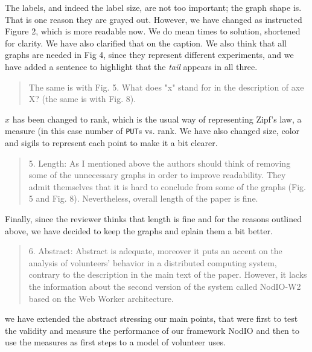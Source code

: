 \documentclass[preprint]{elsarticle}
\begin{document}
The labels, and indeed the label size, are not too important; the
graph shape is. That is one reason they are grayed out. However, we
have changed as instructed Figure 2, which is more readable now. We do
mean times to solution, shortened for clarity. We have also clarified
that on the caption. We also think that all graphs are needed in Fig
4, since they represent different experiments, and we have added a
sentence to highlight that the {\em tail} appears in all three. 

\begin{quote}
The same is with Fig. 5. What does "x" stand for in the description of
axe X? (the same is with Fig. 8).
\end{quote}

$x$ has been changed to {\sf rank}, which is the usual way of
representing Zipf's law, a measure (in this case number of {\tt PUT}s
vs. rank. We have also changed size, color and sigils to represent
each point to make it a bit clearer. 

\begin{quote}

5. Length: As I mentioned above the authors should think of removing some of the unnecessary graphs
in order to improve readability. They admit themselves that it is hard to conclude from some of the
graphs (Fig. 5 and Fig. 8). Nevertheless, overall length of the paper is fine.

\end{quote}

Finally, since the reviewer thinks that length is fine and for the
reasons outlined above, we have decided to keep the graphs and eplain
them a bit better.

\begin{quote}
6. Abstract: Abstract is adequate, moreover it puts an accent on the analysis of volunteers' behavior in a
distributed computing system, contrary to the description in the main text of the paper. However, it
lacks the information about the second version of the system called NodIO-W2 based on the Web
Worker architecture.
\end{quote}

we have extended the abstract stressing our main points, that were
first to test the validity and measure the performance of our
framework NodIO and then to use the measures as first steps to a model
of volunteer uses. 
\end{document}
